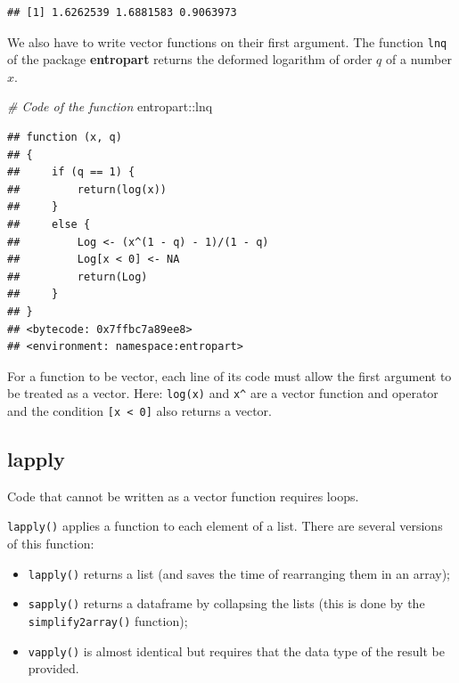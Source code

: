 \documentclass[
  12pt,
  american,
  a4paper,
  extrafontsizes,onecolumn,openright
  ]{memoir}
\newenvironment{Shaded}{\begin{snugshade}}{\end{snugshade}}
\newcommand{\CommentTok}[1]{\textcolor[rgb]{0.56,0.35,0.01}{\textit{#1}}}
\newcommand{\NormalTok}[1]{#1}
\newcommand{\SpecialCharTok}[1]{\textcolor[rgb]{0.00,0.00,0.00}{#1}}
\providecommand{\tightlist}{%
  \setlength{\itemsep}{0pt}\setlength{\parskip}{0pt}}
\begin{document}
\begin{verbatim}
## [1] 1.6262539 1.6881583 0.9063973
\end{verbatim}

\normalsize

We also have to write vector functions on their first argument.
The function \texttt{lnq} of the package \textbf{entropart} returns the deformed logarithm of order \(q\) of a number \(x\).

\scriptsize

\begin{Shaded}
\begin{Highlighting}[]
\CommentTok{\# Code of the function}
\NormalTok{entropart}\SpecialCharTok{::}\NormalTok{lnq}
\end{Highlighting}
\end{Shaded}

\begin{verbatim}
## function (x, q) 
## {
##     if (q == 1) {
##         return(log(x))
##     }
##     else {
##         Log <- (x^(1 - q) - 1)/(1 - q)
##         Log[x < 0] <- NA
##         return(Log)
##     }
## }
## <bytecode: 0x7ffbc7a89ee8>
## <environment: namespace:entropart>
\end{verbatim}

\normalsize

For a function to be vector, each line of its code must allow the first argument to be treated as a vector.
Here: \texttt{log(x)} and \texttt{x\^{}} are a vector function and operator and the condition \texttt{{[}x\ \textless{}\ 0{]}} also returns a vector.

\hypertarget{lapply}{%
\subsection{lapply}\label{lapply}}

Code that cannot be written as a vector function requires loops.

\texttt{lapply()} applies a function to each element of a list.
There are several versions of this function:

\begin{itemize}
\tightlist
\item
  \texttt{lapply()} returns a list (and saves the time of rearranging them in an array);
\item
  \texttt{sapply()} returns a dataframe by collapsing the lists (this is done by the \texttt{simplify2array()} function);
\item
  \texttt{vapply()} is almost identical but requires that the data type of the result be provided.
\end{itemize}
\end{document}

